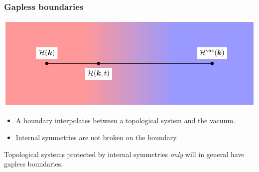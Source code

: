 \documentclass{beamer}
\renewcommand{\(}{\left(}
\renewcommand{\)}{\right)}
\renewcommand{\[}{\left[}
\renewcommand{\]}{\right]}
\begin{document}
\begin{frame}
    \frametitle{Gapless boundaries}
    \begin{center}
        \includegraphics[scale = 0.88]{smooth_boundary.pdf}
    \end{center}
    \begin{itemize}
        \item A boundary interpolates between a topological system and the vacuum. 
        \item Internal symmetries are not broken on the boundary.
    \end{itemize}
    \pause
    \begin{framed}
        Topological systems protected by internal symmetries \emph{only} will in general have gapless boundaries. 
    \end{framed}
\end{frame}
\end{document}
